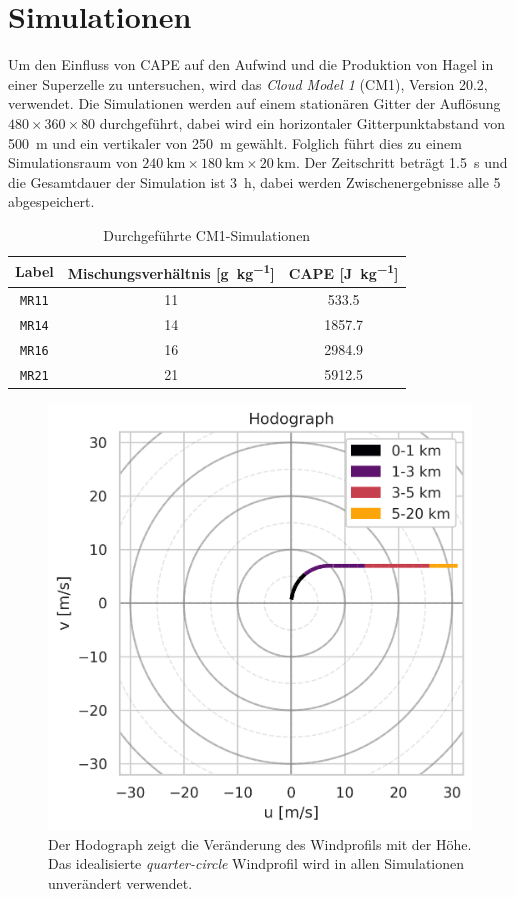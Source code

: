 \section{Simulationen}

Um den Einfluss von CAPE auf den Aufwind und die Produktion von Hagel in einer Superzelle zu untersuchen, wird das \textit{Cloud Model 1} (CM1), Version 20.2, \parencite{bryan2002} verwendet. Die Simulationen werden auf einem stationären Gitter der Auflösung \(\num{480}\times\num{360}\times\num{80}\) durchgeführt, dabei wird ein horizontaler Gitterpunktabstand von \SI{500}{\m} und ein vertikaler von \SI{250}{\m} gewählt. Folglich führt dies zu einem Simulationsraum von \(\SI{240}{\km}\times\SI{180}{\km}\times\SI{20}{\km}\). Der Zeitschritt beträgt \SI{1.5}{\s} und die Gesamtdauer der Simulation ist \SI{3}{\hour}, dabei werden Zwischenergebnisse alle \SI{5}{\min} abgespeichert.

\begin{table}
	\centering
	\begin{tabular}{ccS[table-format=4.1]}
		\toprule
		Label & Mischungsverhältnis [\si{\g\per\kg}] & {CAPE [\si{\J\per\kg}]} \\
		\midrule
		\texttt{MR11} & 11 & 533.5  \\
		\texttt{MR14} & 14 & 1857.7 \\
		\texttt{MR16} & 16 & 2984.9 \\
		\texttt{MR21} & 21 & 5912.5 \\
		\bottomrule
	\end{tabular}
	\caption{Durchgeführte CM1-Simulationen}
	\label{tab:sims}
\end{table}

\begin{figure}
	\centering
	\includegraphics[width=0.6\linewidth]{../figs/hodograph.png}
	\caption{Der Hodograph zeigt die Veränderung des Windprofils mit der Höhe. Das idealisierte \textit{quarter-circle} Windprofil \parencite{weisman2000} wird in allen Simulationen unverändert verwendet.}
	\label{fig:hodograph}
\end{figure}


